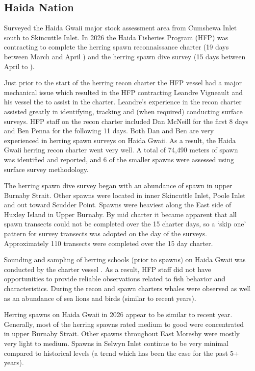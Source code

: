 \subsection{Haida Nation}

Surveyed the Haida Gwaii major stock assessment area from
Cumshewa Inlet south to Skincuttle Inlet.
In 2026 the Haida Fisheries Program (HFP) was contracting to complete
the herring spawn reconnaissance charter (19 days between March  and April )
and the herring spawn dive survey (15 days between April  to ).

Just prior to the start of the herring recon charter
the HFP vessel  had a major mechanical issue
which resulted in the HFP contracting Leandre Vigneault
and his vessel the  to assist in the charter.
Leandre's experience in the recon charter assisted greatly in identifying,
tracking and (when required) conducting surface surveys.
HFP staff on the recon charter included Dan McNeill for the first 8 days and
Ben Penna for the following 11 days.
Both Dan and Ben are very experienced in herring spawn surveys on Haida Gwaii.
As a result, the Haida Gwaii herring recon charter went very well.
A total of 74,490 meters of spawn was identified and reported, and
6 of the smaller spawns were assessed using surface survey methodology.

The herring spawn dive survey began with
an abundance of spawn in upper Burnaby Strait.
Other spawns were located in inner Skincuttle Inlet, Poole Inlet and
out toward Scudder Point.
Spawns were heaviest along the East side of Huxley Island in Upper Burnaby.
By mid charter it became apparent that all spawn transects
could not be completed over the 15 charter days, so a `skip one'
pattern for survey transects was adopted on the  day of the surveys.
Approximately 110 transects were completed over the 15 day charter.

Sounding and sampling of herring schools (prior to spawns) on Haida Gwaii
was conducted by the charter vessel .
As a result, HFP staff did not have opportunities
to provide reliable observations related to fish behavior and characteristics.
During the recon and spawn charters whales were observed
as well as an abundance of sea lions and birds (similar to recent years).

Herring spawns on Haida Gwaii in 2026 appear to be similar to recent year.
Generally, most of the herring spawns rated medium to good
were concentrated in upper Burnaby Strait.
Other spawns throughout East Moresby were mostly very light to medium.
Spawns in Selwyn Inlet continue to be very minimal
compared to historical levels
(a trend which has been the case for the past 5+ years).

